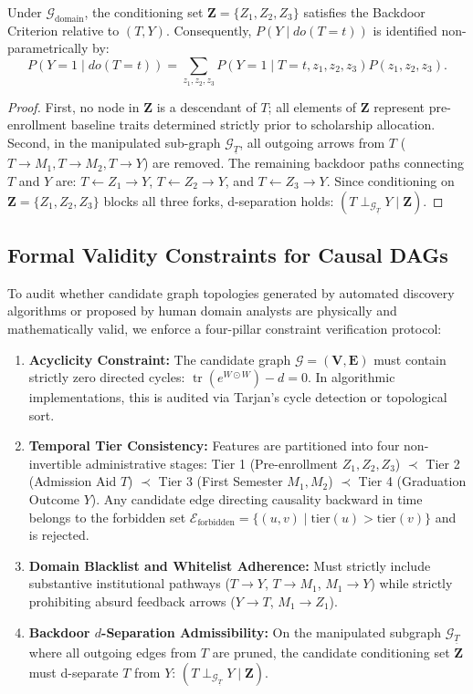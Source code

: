 \begin{theorem}
Under $\mathcal{G}_{\text{domain}}$, the conditioning set $\mathbf{Z} = \{Z_1, Z_2, Z_3\}$ satisfies the Backdoor Criterion relative to $(T, Y)$. Consequently, $P(Y \mid do(T=t))$ is identified non-parametrically by:
\begin{equation}
    P(Y=1 \mid do(T=t)) = \sum_{z_1, z_2, z_3} P(Y=1 \mid T=t, z_1, z_2, z_3) P(z_1, z_2, z_3).
    \label{eq:backdoor_proof_domain}
\end{equation}
\end{theorem}
\begin{proof}
First, no node in $\mathbf{Z}$ is a descendant of $T$; all elements of $\mathbf{Z}$ represent pre-enrollment baseline traits determined strictly prior to scholarship allocation. Second, in the manipulated sub-graph $\mathcal{G}_{\underline{T}}$, all outgoing arrows from $T$ ($T \to M_1, T \to M_2, T \to Y$) are removed. The remaining backdoor paths connecting $T$ and $Y$ are: $T \leftarrow Z_1 \to Y$, $T \leftarrow Z_2 \to Y$, and $T \leftarrow Z_3 \to Y$. Since conditioning on $\mathbf{Z} = \{Z_1, Z_2, Z_3\}$ blocks all three forks, d-separation holds: $(T \perp_{\mathcal{G}_{\underline{T}}} Y \mid \mathbf{Z})$.
\end{proof}


\subsection{Formal Validity Constraints for Causal DAGs}
To audit whether candidate graph topologies generated by automated discovery algorithms or proposed by human domain analysts are physically and mathematically valid, we enforce a four-pillar constraint verification protocol:
\begin{enumerate}
    \item \textbf{Acyclicity Constraint:} The candidate graph $\mathcal{G} = (\mathbf{V}, \mathbf{E})$ must contain strictly zero directed cycles: $\operatorname{tr}(e^{W \odot W}) - d = 0$. In algorithmic implementations, this is audited via Tarjan's cycle detection or topological sort.
    \item \textbf{Temporal Tier Consistency:} Features are partitioned into four non-invertible administrative stages: Tier 1 (Pre-enrollment $Z_1, Z_2, Z_3$) $\prec$ Tier 2 (Admission Aid $T$) $\prec$ Tier 3 (First Semester $M_1, M_2$) $\prec$ Tier 4 (Graduation Outcome $Y$). Any candidate edge directing causality backward in time belongs to the forbidden set $\mathcal{E}_{\text{forbidden}} = \{(u, v) \mid \text{tier}(u) > \text{tier}(v)\}$ and is rejected.
    \item \textbf{Domain Blacklist and Whitelist Adherence:} Must strictly include substantive institutional pathways ($T \to Y$, $T \to M_1$, $M_1 \to Y$) while strictly prohibiting absurd feedback arrows ($Y \to T$, $M_1 \to Z_1$).
    \item \textbf{Backdoor $d$-Separation Admissibility:} On the manipulated subgraph $\mathcal{G}_{\underline{T}}$ where all outgoing edges from $T$ are pruned, the candidate conditioning set $\mathbf{Z}$ must d-separate $T$ from $Y$: $(T \perp_{\mathcal{G}_{\underline{T}}} Y \mid \mathbf{Z})$.
\end{enumerate}
